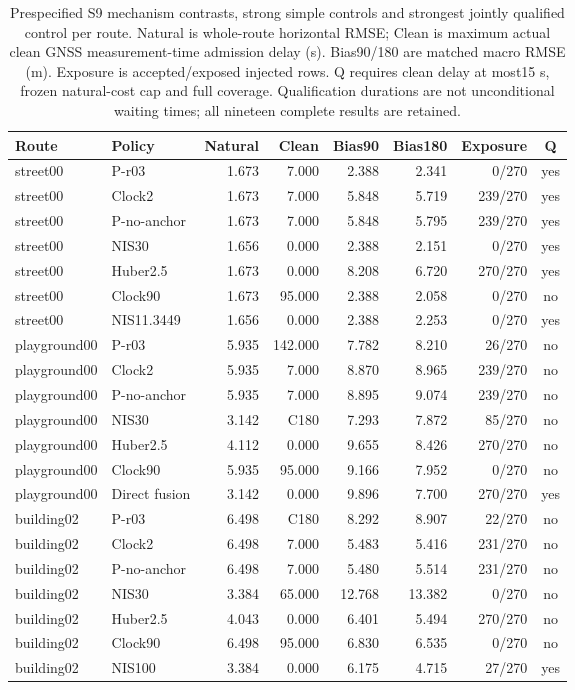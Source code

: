 \begin{table}[t]\centering\small
\caption{Prespecified S9 mechanism contrasts, strong simple controls and strongest jointly qualified control per route. Natural is whole-route horizontal RMSE; Clean is maximum actual clean GNSS measurement-time admission delay (s). Bias90/180 are matched macro RMSE (m). Exposure is accepted/exposed injected rows. Q requires clean delay at most15 s, frozen natural-cost cap and full coverage. Qualification durations are not unconditional waiting times; all nineteen complete results are retained.}\label{tab:primary}
\begin{tabular}{llrrrrrc}\toprule
Route & Policy & Natural & Clean & Bias90 & Bias180 & Exposure & Q\\\midrule
street00 & P-r03 & 1.673 & 7.000 & 2.388 & 2.341 & 0/270 & yes \\
street00 & Clock2 & 1.673 & 7.000 & 5.848 & 5.719 & 239/270 & yes \\
street00 & P-no-anchor & 1.673 & 7.000 & 5.848 & 5.795 & 239/270 & yes \\
street00 & NIS30 & 1.656 & 0.000 & 2.388 & 2.151 & 0/270 & yes \\
street00 & Huber2.5 & 1.673 & 0.000 & 8.208 & 6.720 & 270/270 & yes \\
street00 & Clock90 & 1.673 & 95.000 & 2.388 & 2.058 & 0/270 & no \\
street00 & NIS11.3449 & 1.656 & 0.000 & 2.388 & 2.253 & 0/270 & yes \\
playground00 & P-r03 & 5.935 & 142.000 & 7.782 & 8.210 & 26/270 & no \\
playground00 & Clock2 & 5.935 & 7.000 & 8.870 & 8.965 & 239/270 & no \\
playground00 & P-no-anchor & 5.935 & 7.000 & 8.895 & 9.074 & 239/270 & no \\
playground00 & NIS30 & 3.142 & C180 & 7.293 & 7.872 & 85/270 & no \\
playground00 & Huber2.5 & 4.112 & 0.000 & 9.655 & 8.426 & 270/270 & no \\
playground00 & Clock90 & 5.935 & 95.000 & 9.166 & 7.952 & 0/270 & no \\
playground00 & Direct fusion & 3.142 & 0.000 & 9.896 & 7.700 & 270/270 & yes \\
building02 & P-r03 & 6.498 & C180 & 8.292 & 8.907 & 22/270 & no \\
building02 & Clock2 & 6.498 & 7.000 & 5.483 & 5.416 & 231/270 & no \\
building02 & P-no-anchor & 6.498 & 7.000 & 5.480 & 5.514 & 231/270 & no \\
building02 & NIS30 & 3.384 & 65.000 & 12.768 & 13.382 & 0/270 & no \\
building02 & Huber2.5 & 4.043 & 0.000 & 6.401 & 5.494 & 270/270 & no \\
building02 & Clock90 & 6.498 & 95.000 & 6.830 & 6.535 & 0/270 & no \\
building02 & NIS100 & 3.384 & 0.000 & 6.175 & 4.715 & 27/270 & yes \\
\bottomrule\end{tabular}\end{table}
